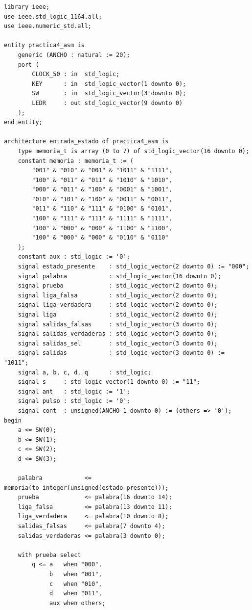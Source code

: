 \documentclass[11pt,letterpaper]{article}
\begin{document}
\begin{lstlisting}[style=vhdl]
library ieee;
use ieee.std_logic_1164.all;
use ieee.numeric_std.all;

entity practica4_asm is
    generic (ANCHO : natural := 20);
    port (
        CLOCK_50 : in  std_logic;
        KEY      : in  std_logic_vector(1 downto 0);
        SW       : in  std_logic_vector(3 downto 0);
        LEDR     : out std_logic_vector(9 downto 0)
    );
end entity;

architecture entrada_estado of practica4_asm is
    type memoria_t is array (0 to 7) of std_logic_vector(16 downto 0);
    constant memoria : memoria_t := (
        "001" & "010" & "001" & "1011" & "1111",
        "100" & "011" & "011" & "1010" & "1010",
        "000" & "011" & "100" & "0001" & "1001",
        "010" & "101" & "100" & "0011" & "0011",
        "011" & "110" & "111" & "0100" & "0101",
        "100" & "111" & "111" & "1111" & "1111",
        "100" & "000" & "000" & "1100" & "1100",
        "100" & "000" & "000" & "0110" & "0110"
    );
    constant aux : std_logic := '0';
    signal estado_presente    : std_logic_vector(2 downto 0) := "000";
    signal palabra            : std_logic_vector(16 downto 0);
    signal prueba             : std_logic_vector(2 downto 0);
    signal liga_falsa         : std_logic_vector(2 downto 0);
    signal liga_verdadera     : std_logic_vector(2 downto 0);
    signal liga               : std_logic_vector(2 downto 0);
    signal salidas_falsas     : std_logic_vector(3 downto 0);
    signal salidas_verdaderas : std_logic_vector(3 downto 0);
    signal salidas_sel        : std_logic_vector(3 downto 0);
    signal salidas            : std_logic_vector(3 downto 0) := "1011";
    signal a, b, c, d, q      : std_logic;
    signal s     : std_logic_vector(1 downto 0) := "11";
    signal ant   : std_logic := '1';
    signal pulso : std_logic := '0';
    signal cont  : unsigned(ANCHO-1 downto 0) := (others => '0');
begin
    a <= SW(0);
    b <= SW(1);
    c <= SW(2);
    d <= SW(3);

    palabra            <= memoria(to_integer(unsigned(estado_presente)));
    prueba             <= palabra(16 downto 14);
    liga_falsa         <= palabra(13 downto 11);
    liga_verdadera     <= palabra(10 downto 8);
    salidas_falsas     <= palabra(7 downto 4);
    salidas_verdaderas <= palabra(3 downto 0);

    with prueba select
        q <= a   when "000",
             b   when "001",
             c   when "010",
             d   when "011",
             aux when others;


\end{lstlisting}
\end{document}
